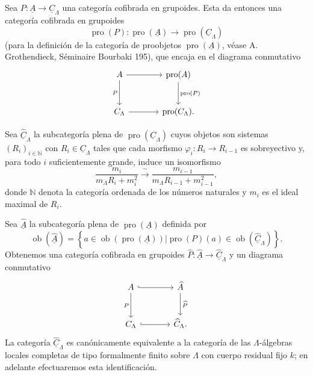 
Sea $P:\underline A\longrightarrow\underline C_\Lambda$ una
categoría cofibrada en grupoides. Esta da entonces una categoría
cofibrada en grupoides
\[
 \operatorname{pro}(P):\operatorname{pro}(\underline A)
 \longrightarrow\operatorname{pro}(\underline C_\Lambda)
\]
(para la definición de la categoría de proobjetos
$\operatorname{pro}(\underline A)$, véase A. Grothendieck,
S\'eminaire Bourbaki 195), que encaja en el diagrama conmutativo
\[
\begin{tikzcd}[column sep=large,row sep=large]
\underline A \arrow[r] \arrow[d,"P"']
 & \operatorname{pro}(\underline A)
   \arrow[d,"\operatorname{pro}(P)"] \\
\underline C_\Lambda \arrow[r]
 & \operatorname{pro}(\underline C_\Lambda).
\end{tikzcd}
\]

Sea $\widehat{\underline C}_\Lambda$ la subcategoría plena de
$\operatorname{pro}(\underline C_\Lambda)$ cuyos objetos son sistemas
$(R_i)_{i\in\mathbb N}$ con $R_i\in\underline C_\Lambda$ tales que
cada morfismo $\varphi_i:R_i\longrightarrow R_{i-1}$ es sobreyectivo
y, para todo $i$ suficientemente grande, induce un isomorfismo
\[
 \frac{m_i}{m_\Lambda R_i+m_i^2}
 \xrightarrow{\ \sim\ }
 \frac{m_{i-1}}{m_\Lambda R_{i-1}+m_{i-1}^2},
\]
donde $\mathbb N$ denota la categoría ordenada de los números naturales
y $m_i$ es el ideal maximal de $R_i$.

Sea $\widehat{\underline A}$ la subcategoría plena de
$\operatorname{pro}(\underline A)$ definida por
\[
 \operatorname{ob}(\widehat{\underline A})=
 \left\{a\in\operatorname{ob}(\operatorname{pro}(\underline A))
 \mathrel{\Big|}
 \operatorname{pro}(P)(a)\in
 \operatorname{ob}(\widehat{\underline C}_\Lambda)\right\}.
\]
Obtenemos una categoría cofibrada en grupoides
$\widehat P:\widehat{\underline A}\longrightarrow
\widehat{\underline C}_\Lambda$ y un diagrama conmutativo
\[
\begin{tikzcd}[column sep=large,row sep=large]
\underline A \arrow[r,hook] \arrow[d,"P"']
 & \widehat{\underline A} \arrow[d,"\widehat P"] \\
\underline C_\Lambda \arrow[r,hook]
 & \widehat{\underline C}_\Lambda.
\end{tikzcd}
\]
La categoría $\widehat{\underline C}_\Lambda$ es canónicamente
equivalente a la categoría de las $\Lambda$-álgebras locales completas
de tipo formalmente finito sobre $\Lambda$ con cuerpo residual fijo
$k$; en adelante efectuaremos esta identificación.

